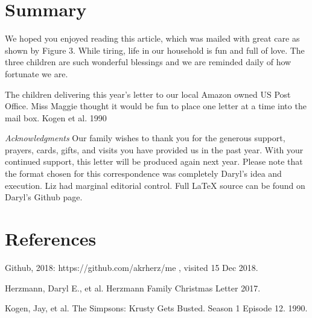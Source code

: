 \documentclass[letterpaper,11pt]{article}
\makeatletter
\def\refer{\par\noindent\hangindent\parindent\hangafter1}
\newenvironment{figurehere}
  {\def\@captype{figure}}
  {}
\makeatother
\begin{document}
\begin{multicols}{2}
\section{Summary}

We hoped you enjoyed reading this article, which was mailed with great care
as shown by Figure 3.  While tiring, life in our household is fun and full of
love.  The three children are such wonderful blessings and we are reminded daily of
how fortunate we are. 

\bigskip
\begin{figurehere}
 \centering   
 \caption{The children delivering this year's letter to our local Amazon owned
 US Post Office. Miss Maggie thought it would be fun to place one letter at 
 a time into the mail box. \textsection \hspace{3pt} Kogen et al. 1990}
\end{figurehere}

\bigskip
  \emph{Acknowledgments} Our family wishes to thank you for the generous 
support, prayers, cards, gifts, and visits you have provided us in the past
year. With your continued support, this letter will be produced again
next year. Please note that the format chosen for this
correspondence was completely Daryl's idea and execution. Liz had marginal
editorial control. Full \LaTeX\xspace source can be found on Daryl's Github
page.

\section{References}

\refer Github, 2018: https://github.com/akrherz/me , visited 15 Dec 2018.
\refer Herzmann, Daryl E., et al. Herzmann Family Christmas Letter 2017.
\refer Kogen, Jay, et al. The Simpsons: Krusty Gets Busted. Season 1 Episode 12. 1990. 

\end{multicols}
\end{document}
